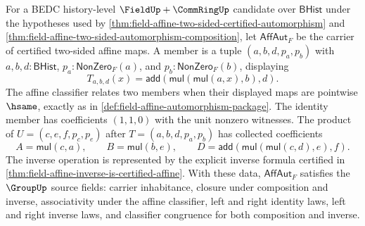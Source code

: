 \begin{theorem}
\label{thm:field-affine-automorphism-group-laws}
For a BEDC history-level $\FieldUp+\CommRingUp$ candidate over
$\mathsf{BHist}$ under the hypotheses used by
\autoref{thm:field-affine-two-sided-certified-automorphism} and
\autoref{thm:field-affine-two-sided-automorphism-composition}, let
$\mathsf{AffAut}_F$ be the carrier of certified two-sided affine maps. A member
is a tuple $(a,b,d,p_a,p_b)$ with $a,b,d:\mathsf{BHist}$,
$p_a:\mathsf{NonZero}_F(a)$, and $p_b:\mathsf{NonZero}_F(b)$, displaying
$$
T_{a,b,d}(x)=\mathsf{add}(\mathsf{mul}(\mathsf{mul}(a,x),b),d).
$$
The affine classifier relates two members when their displayed maps are
pointwise $\hsame$, exactly as in
\autoref{def:field-affine-automorphism-package}. The identity member has
coefficients $(1,1,0)$ with the unit nonzero witnesses. The product of
$U=(c,e,f,p_c,p_e)$ after
$T=(a,b,d,p_a,p_b)$ has collected coefficients
$$
A=\mathsf{mul}(c,a),
\qquad
B=\mathsf{mul}(b,e),
\qquad
D=\mathsf{add}(\mathsf{mul}(\mathsf{mul}(c,d),e),f).
$$
The inverse operation is represented by the explicit inverse formula certified
in \autoref{thm:field-affine-inverse-is-certified-affine}. With these data,
$\mathsf{AffAut}_F$ satisfies the $\GroupUp$ source fields: carrier
inhabitance, closure under composition and inverse, associativity under the
affine classifier, left and right identity laws, left and right inverse laws,
and classifier congruence for both composition and inverse.
\end{theorem}
